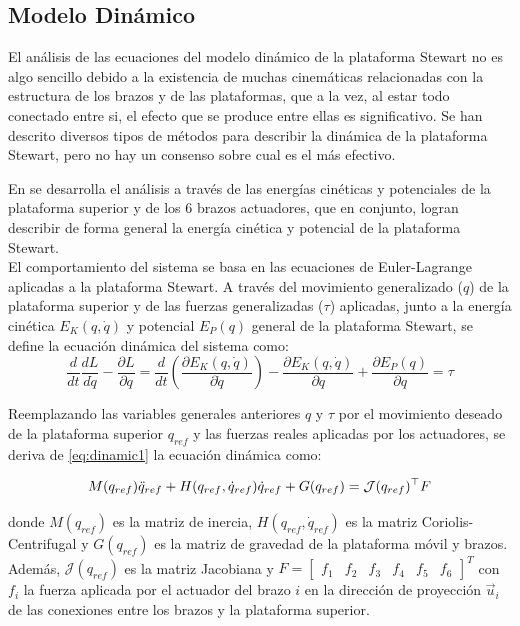 \subsection{Modelo Dinámico}

El análisis de las ecuaciones del modelo dinámico de la plataforma Stewart no es algo sencillo debido a la existencia de muchas cinemáticas relacionadas con la estructura de los brazos y de las plataformas, que a la vez, al estar todo conectado entre si, el efecto que se produce entre ellas es significativo. Se han descrito diversos tipos de métodos para describir la dinámica de la plataforma Stewart, pero no hay un consenso sobre cual es el más efectivo. 

En \cite{bingul2012modeling} se desarrolla el análisis a través de las energías cinéticas y potenciales de la plataforma superior y de los 6 brazos actuadores, que en conjunto, logran describir de forma general la energía cinética y potencial de la plataforma Stewart.\\

El comportamiento del sistema se basa en las ecuaciones de Euler-Lagrange aplicadas a la plataforma Stewart. A través del movimiento generalizado ($q$) de la plataforma superior y de las fuerzas generalizadas ($\tau$) aplicadas, junto a la energía cinética $E_K(q,\dot{q})$ y potencial $E_P(q)$ general de la plataforma Stewart, se define la ecuación dinámica del sistema como:
\begin{equation} \label{eq:dinamic1}
    \frac{d}{dt} \frac{dL}{d \dot{q}} - \frac{\partial L}{\partial q} = \frac{d}{dt} \left( \frac{\partial E_K(q,\dot{q})}{\partial \dot{q}} \right) - \frac{\partial E_K(q,\dot{q})}{\partial q} + \frac{\partial E_P(q)}{\partial q} = \tau
\end{equation}

Reemplazando las variables generales anteriores $q$ y $\tau$ por el movimiento deseado de la plataforma superior $q_{ref}$ y las fuerzas reales aplicadas por los actuadores, se deriva de \ref{eq:dinamic1} la ecuación dinámica como:

\begin{equation} \label{eq:dinamic2}
    M(q_{ref}) \Ddot{q}_{ref} + H(q_{ref},\dot{q}_{ref}) \dot{q}_{ref} + G(q_{ref}) = \mathcal{J}(q_{ref})^{\top} F
\end{equation}

donde $M(q_{ref})$ es la matriz de inercia, $H(q_{ref},\dot{q}_{ref})$ es la matriz Coriolis-Centrifugal y $G(q_{ref})$ es la matriz de gravedad de la plataforma móvil y brazos. Además, $\mathcal{J}(q_{ref})$ es la matriz Jacobiana y $F=\begin{bmatrix} f_1 & f_2 & f_3 & f_4 & f_5 & f_6 \end{bmatrix}^T$ con $f_i$ la fuerza aplicada por el actuador del brazo $i$ en la dirección de proyección $\vec{u}_i$ de las conexiones entre los brazos y la plataforma superior.


